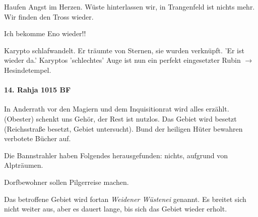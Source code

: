 Haufen Angst im Herzen. Wüste hinterlassen wir, in Trangenfeld ist nichts mehr. Wir finden den Tross wieder. 

{\color{green} Ich bekomme Eno wieder!!}

Karypto schlafwandelt. Er träumte von Sternen, sie wurden verknüpft. 'Er ist wieder da.' Karyptos 'schlechtes' Auge ist nun ein perfekt eingesetzter Rubin $\rightarrow$ Hesindetempel.

\paragraph{14. Rahja 1015 BF} In Anderrath vor den Magiern und dem Inquisitionrat wird alles erzählt.  (Obester) schenkt uns Gehör, der Rest ist nutzlos. Das Gebiet wird besetzt (Reichsstraße besetzt, Gebiet untersucht). Bund der heiligen Hüter bewahren verbotete Bücher auf. 

Die Bannstrahler haben Folgendes herausgefunden: nichts, aufgrund von Alpträumen. 

Dorfbewohner sollen Pilgerreise machen. 
\begin{figure}[htb!]
\centering
{}
\end{figure}
Das betroffene Gebiet wird fortan \emph{Weidener Wüstenei} genannt. Es breitet sich nicht weiter aus, aber es dauert lange, bis sich das Gebiet wieder erholt.